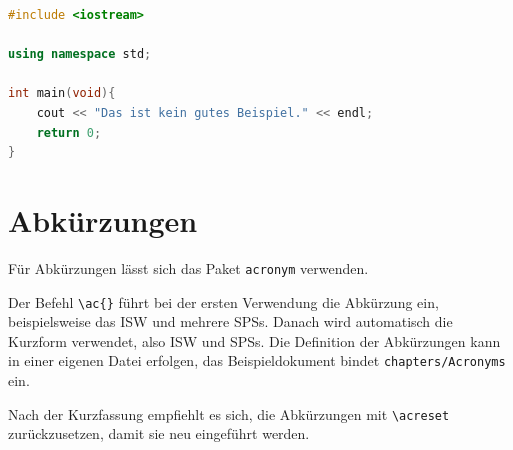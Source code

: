 \begin{lstlisting}[language=C++, caption={Dieser Code eignet sich nicht zum Aufführen in Ihrer Arbeit.}, label={lst:bad_code_example}]
#include <iostream>

using namespace std;

int main(void){
    cout << "Das ist kein gutes Beispiel." << endl;
    return 0;
}
\end{lstlisting}

\section{Abkürzungen}

Für Abkürzungen lässt sich das Paket \texttt{acronym} verwenden. 

Der Befehl \texttt{\textbackslash ac\{\}} führt bei der ersten Verwendung die Abkürzung ein, beispielsweise das \ac{ISW} und mehrere \acp{SPS}. Danach wird automatisch die Kurzform verwendet, also \ac{ISW} und \acp{SPS}. Die Definition der Abkürzungen kann in einer eigenen Datei erfolgen, das Beispieldokument bindet \texttt{chapters/Acronyms} ein.

Nach der Kurzfassung empfiehlt es sich, die Abkürzungen mit \texttt{\textbackslash acreset} zurückzusetzen, damit sie neu eingeführt werden.



\nocite{*}